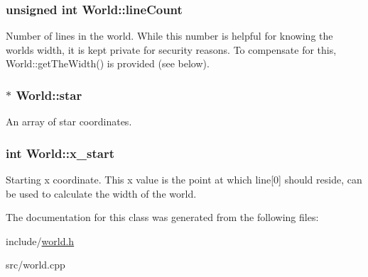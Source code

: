 \subsubsection[{line\+Count}]{\setlength{\rightskip}{0pt plus 5cm}unsigned int World\+::line\+Count\hspace{0.3cm}{\ttfamily [protected]}}\label{classWorld_a432e07fd7f7504aaa6ff29408afe0678}
Number of lines in the world. While this number is helpful for knowing the world\textquotesingle{}s width, it is kept private for security reasons. To compensate for this, World\+::get\+The\+Width() is provided (see below). \hypertarget{classWorld_a4f8b12f8eda220060ec01c0e9a6b9325}{}
\subsubsection[{star}]{$\ast$ World\+::star\hspace{0.3cm}{\ttfamily [protected]}}\label{classWorld_a4f8b12f8eda220060ec01c0e9a6b9325}
An array of star coordinates. \hypertarget{classWorld_a645767ccf316a9b4469db773ac111ae4}{}
\subsubsection[{x\+\_\+start}]{\setlength{\rightskip}{0pt plus 5cm}int World\+::x\+\_\+start\hspace{0.3cm}{\ttfamily [protected]}}\label{classWorld_a645767ccf316a9b4469db773ac111ae4}
Starting x coordinate. This x value is the point at which line\mbox{[}0\mbox{]} should reside, can be used to calculate the width of the world. 

The documentation for this class was generated from the following files\+:\begin{DoxyCompactItemize}
\item 
include/\hyperlink{world_8h}{world.\+h}\item 
src/world.\+cpp\end{DoxyCompactItemize}
